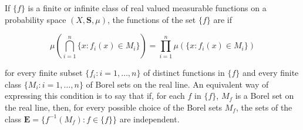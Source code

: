 If $\{f\}$ is a finite or infinite class of real valued measurable functions on a probability space $(X, \mathbf{S}, \mu)$, the functions of the set $\{f\}$ are  if

$$\mu\left(\bigcap_{i=1}^{n} \{x : f_i(x) \in M_i\}\right) = \prod_{i=1}^{n} \mu\left(\{x : f_i(x) \in M_i\}\right)$$

for every finite subset $\{f_i : i = 1, \dots, n\}$ of distinct functions in $\{f\}$ and every finite class $\{M_i : i = 1, \dots, n\}$ of Borel sets on the real line. An equivalent way of expressing this condition is to say that if, for each $f$ in $\{f\}$, $M_f$ is a Borel set on the real line, then, for every possible choice of the Borel sets $M_f$, the sets of the class $\mathbf{E} = \{f^{-1}(M_f) : f \in \{f\}\}$ are independent.
